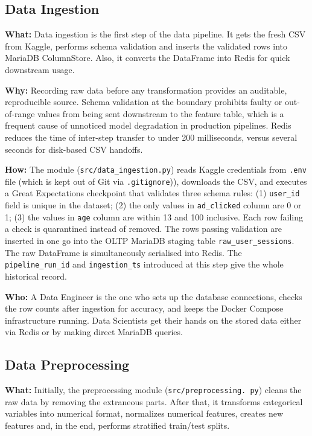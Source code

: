 \documentclass[12pt,a4paper]{article}
\begin{document}
\subsection{Data Ingestion}

\textbf{What:} Data ingestion is the first step of the data pipeline. It gets the fresh CSV from Kaggle, performs schema validation and inserts the validated rows into MariaDB ColumnStore.
Also, it converts the DataFrame into Redis for quick downstream usage.

\textbf{Why:} Recording raw data before any transformation provides an auditable, reproducible source.
Schema validation at the boundary prohibits faulty or out-of-range values from being sent downstream to the feature table, which is a frequent cause of unnoticed model degradation in production pipelines.
Redis reduces the time of inter-step transfer to under 200 milliseconds, versus several seconds for disk-based CSV handoffs.

\textbf{How:} The module (\texttt{src/data\_ingestion.py}) reads Kaggle credentials from \texttt{.env} file (which
is kept out of Git via \texttt{.gitignore})), downloads the CSV, and executes a Great Expectations \cite{greatexpectations}
checkpoint that validates three schema rules: (1) \texttt{user\_id} field is unique in the dataset;
(2) the only values in \texttt{ad\_clicked} column are 0 or 1; (3) the values in \texttt{age} column are within 13 and 100
inclusive. Each row failing a check is quarantined instead of removed. The rows passing validation
are inserted in one go into the OLTP MariaDB staging table \texttt{raw\_user\_sessions}.
The raw DataFrame is simultaneously serialised into Redis. The \texttt{pipeline\_run\_id}
and \texttt{ingestion\_ts} introduced at this step give the whole historical record.

\textbf{Who:} A Data Engineer is the one who sets up the database connections, checks the row counts after ingestion for accuracy, and keeps the Docker Compose infrastructure running.
Data Scientists get their hands on the stored data either via Redis or by making direct MariaDB queries. 

\subsection{Data Preprocessing}

\textbf{What:} Initially, the preprocessing module (\texttt{src/preprocessing. py}) cleans the raw data by removing the extraneous parts.
After that, it transforms categorical variables into numerical format, normalizes numerical features, creates new features and, in the end, performs stratified train/test splits. 
\end{document}
